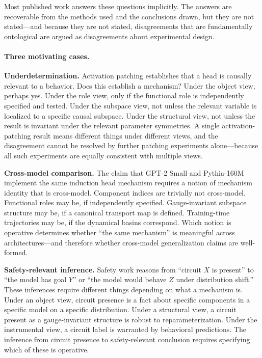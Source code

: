 \documentclass[11pt]{article}
\theoremstyle{remark}
\begin{document}
Most published work answers these questions implicitly.  The answers are
recoverable from the methods used and the conclusions drawn, but they are
not stated---and because they are not stated, disagreements that are
fundamentally ontological are argued as disagreements about experimental
design.

\paragraph{Three motivating cases.}

\textbf{Underdetermination.}  Activation patching establishes that a
head is causally relevant to a behavior.  Does this establish a
mechanism?  Under the object view, perhaps yes.  Under the role view,
only if the functional role is independently specified and tested.
Under the subspace view, not unless the relevant variable is localized
to a specific causal subspace.  Under the structural view, not unless
the result is invariant under the relevant parameter symmetries.  A
single activation-patching result means different things under different
views, and the disagreement cannot be resolved by further patching
experiments alone---because all such experiments are equally consistent
with multiple views.

\textbf{Cross-model comparison.}  The claim that GPT-2 Small and
Pythia-160M implement the same induction head mechanism requires a
notion of mechanism identity that is cross-model.  Component indices are
trivially not cross-model.  Functional roles may be, if independently
specified.  Gauge-invariant subspace structure may be, if a canonical
transport map is defined.  Training-time trajectories may be, if the
dynamical basins correspond.  Which notion is operative determines
whether ``the same mechanism'' is meaningful across architectures---and
therefore whether cross-model generalization claims are well-formed.

\textbf{Safety-relevant inference.}  Safety work \citep{ngo2022} reasons
from ``circuit $X$ is present'' to ``the model has goal $Y$'' or ``the
model would behave $Z$ under distribution shift.''  These inferences require
different things depending on what a mechanism is.  Under an object view,
circuit presence is a fact about specific components in a specific model
on a specific distribution.  Under a structural view, a circuit present
as a gauge-invariant structure is robust to reparameterization.  Under
the instrumental view, a circuit label is warranted by behavioral
predictions.  The inference from circuit presence to safety-relevant
conclusion requires specifying which of these is operative.
\end{document}
